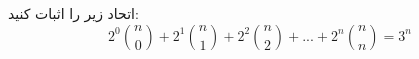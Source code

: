 \p
 اتحاد زیر را اثبات کنید:
    \[2^0\binom{n}{0}+2^1\binom{n}{1}+2^2\binom{n}{2}+...+2^n\binom{n}{n}= 3^n\]